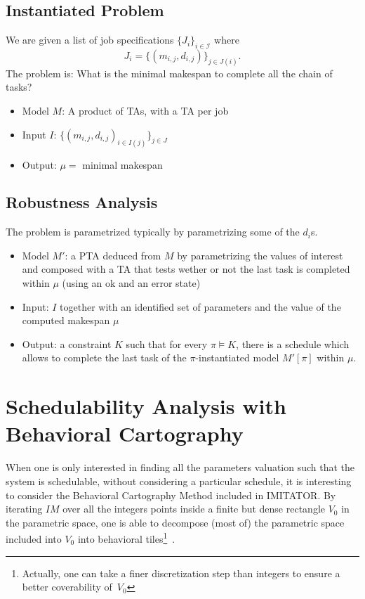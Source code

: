 \documentclass{article}
\begin{document}
\subsection{Instantiated Problem}
We are given a list of job specifications $\{J_i\}_{i \in \mathcal{I}}$ where $$J_i =\{(m_{i,j},d_{i,j})\}_{j \in J(i)}.$$ 
The problem is: What is the minimal makespan to complete all the chain of tasks?
\begin{itemize}
 \item Model $M$: A product of TAs, with a TA per job
 \item Input $I$:  $\{(m_{i,j},d_{i,j})_{i\in I(j)}\}_{j \in J}$
 \item Output: $\mu =$ minimal makespan
\end{itemize}


\subsection{Robustness Analysis}
The problem is parametrized typically by parametrizing some of the $d_i$s.


\begin{itemize}
 \item Model $M'$: a PTA deduced from $M$ by parametrizing the values of interest and composed with a TA that tests wether or not the last task is completed within $\mu$ (using an ok and an error state)\\
 \item Input: $I$ together with an identified set of parameters and the value of the computed makespan $\mu$ \\
 \item Output: a constraint $K$ such that for every $\pi \models K$, there is a schedule which allows to complete the last task of the $\pi$-instantiated model $M'[\pi]$ within $\mu$.
\end{itemize}

\section{Schedulability Analysis with Behavioral Cartography}
\label{sec:bb04}
When one is only interested in finding all the parameters valuation such that the system is schedulable, without considering a particular schedule, it is interesting to consider the Behavioral Cartography Method
included in IMITATOR. 
 By iterating $IM$ over all the integers points %
inside a finite but dense rectangle $V_0$ in the parametric space, one is able to decompose (most of) the parametric space included into $V_0$ into behavioral tiles\footnote{Actually, one can take a finer discretization step than integers to ensure a better coverability of~$V_0$}~\cite{af10}.
\end{document}
